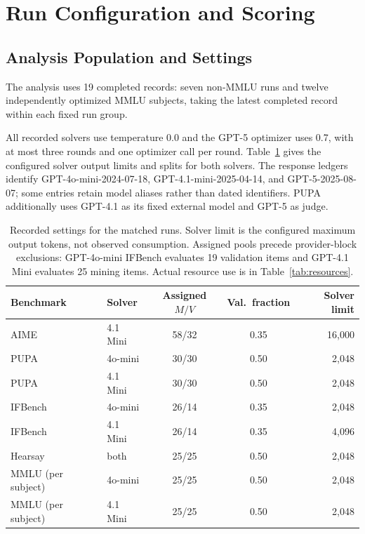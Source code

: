 \documentclass[10pt]{article} %
\begin{document}
\section{Run Configuration and Scoring}
\label{app:config}
\subsection{Analysis Population and Settings}
\label{app:population}
The analysis uses 19 completed records: seven non-MMLU runs and twelve independently optimized MMLU
subjects, taking the latest completed record within each fixed run group.

All recorded solvers use temperature 0.0 and the GPT-5 optimizer uses 0.7, with at most three rounds and one optimizer
call per round. Table~\ref{tab:config} gives the configured solver output limits and splits for both solvers.
The response ledgers identify GPT-4o-mini-2024-07-18, GPT-4.1-mini-2025-04-14, and GPT-5-2025-08-07; some entries retain
model aliases rather than dated identifiers. PUPA additionally uses GPT-4.1 as its fixed external model and GPT-5 as judge.

\begin{table}[htbp]
\caption{Recorded settings for the matched runs. Solver limit is the configured maximum output tokens, not observed
consumption. Assigned pools precede provider-block exclusions: GPT-4o-mini IFBench evaluates 19 validation items and
GPT-4.1 Mini evaluates 25 mining items. Actual resource use is in Table~\ref{tab:resources}.}
\label{tab:config}
\begin{center}
\small
\setlength{\tabcolsep}{5pt}
\begin{tabular}{llccr}
\toprule
\rowcolor{midblue}Benchmark & Solver & Assigned $M/V$ & Val.\ fraction & Solver limit \\
\midrule
AIME & 4.1 Mini & 58/32 & 0.35 & 16,000 \\
PUPA & 4o-mini & 30/30 & 0.50 & 2,048 \\
PUPA & 4.1 Mini & 30/30 & 0.50 & 2,048 \\
IFBench & 4o-mini & 26/14 & 0.35 & 2,048 \\
IFBench & 4.1 Mini & 26/14 & 0.35 & 4,096 \\
Hearsay & both & 25/25 & 0.50 & 2,048 \\
MMLU (per subject) & 4o-mini & 25/25 & 0.50 & 2,048 \\
MMLU (per subject) & 4.1 Mini & 25/25 & 0.50 & 2,048 \\
\bottomrule
\end{tabular}
\end{center}
\end{table}
\end{document}
